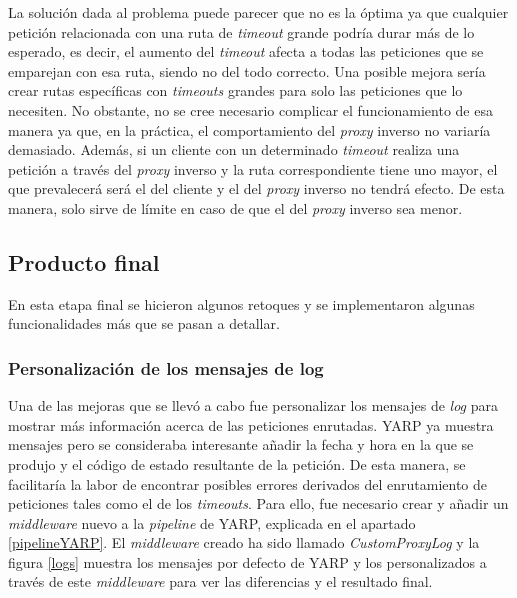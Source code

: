 \documentclass[11pt,spanish,listoffigures]{tfgetsinf}
\begin{document}
La solución dada al problema puede parecer que no es la óptima ya que cualquier petición relacionada con una ruta de \emph{timeout} grande podría durar más de lo esperado, es decir, el aumento del \emph{timeout} afecta a todas las peticiones que se emparejan con esa ruta, siendo no del todo correcto. Una posible mejora sería crear rutas específicas con \emph{timeouts} grandes para solo las peticiones que lo necesiten. No obstante, no se cree necesario complicar el funcionamiento de esa manera ya que, en la práctica, el comportamiento del \emph{proxy} inverso no variaría demasiado. Además, si un cliente con un determinado \emph{timeout} realiza una petición a través del \emph{proxy} inverso y la ruta correspondiente tiene uno mayor, el que prevalecerá será el del cliente y el del \emph{proxy} inverso no tendrá efecto. De esta manera, solo sirve de límite en caso de que el del \emph{proxy} inverso sea menor.


		\subsection{Producto final}

En esta etapa final se hicieron algunos retoques y se implementaron algunas funcionalidades más que se pasan a detallar.


			\subsubsection{Personalización de los mensajes de log}

Una de las mejoras que se llevó a cabo fue personalizar los mensajes de \emph{log} para mostrar más información acerca de las peticiones enrutadas. YARP ya muestra mensajes pero se consideraba interesante añadir la fecha y hora en la que se produjo y el código de estado resultante de la petición. De esta manera, se facilitaría la labor de encontrar posibles errores derivados del enrutamiento de peticiones tales como el de los \emph{timeouts}. Para ello, fue necesario crear y añadir un \emph{middleware} nuevo a la \emph{pipeline} de YARP, explicada en el apartado \ref{pipelineYARP}. El \emph{middleware} creado ha sido llamado \emph{CustomProxyLog} y la figura \ref{logs} muestra los mensajes por defecto de YARP y los personalizados a través de este \emph{middleware} para ver las diferencias y el resultado final.
\end{document}
